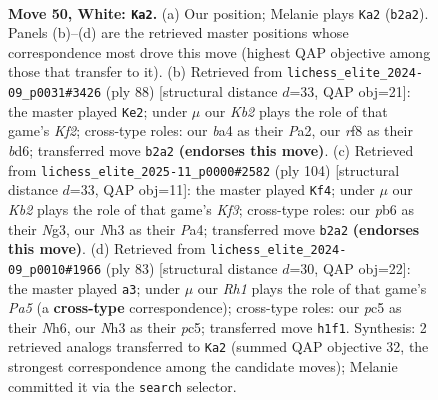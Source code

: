 \documentclass[11pt]{article}
\begin{document}
\clearpage

\begin{figure}[p]\centering
\begin{subfigure}{0.46\textwidth}\centering
\resizebox{\linewidth}{!}{%
\newchessgame
\chessboard[
  setfen={5r2/7k/1p6/p1p1r3/b7/2P2pPN/1K1N3P/7R w - - 6 50},
  showmover=false,
  pgfstyle=straightmove, color=movearrow, markmove={b2-a2}
]}
\caption{}
\end{subfigure}\hfill
\begin{subfigure}{0.46\textwidth}\centering
\resizebox{\linewidth}{!}{%
\newchessgame
\chessboard[
  setfen={3r4/7P/p1kb1pN1/Pp2p3/2p5/4P3/P4K2/7R w - - 3 45},
  showmover=false,
  pgfstyle=straightmove, color=movearrow, markmove={f2-e2}
]}
\caption{}
\end{subfigure}
\\[4pt]
\begin{subfigure}{0.46\textwidth}\centering
\resizebox{\linewidth}{!}{%
\newchessgame
\chessboard[
  setfen={6b1/2k1r3/1p5p/2p2P1P/Pp6/1P3KN1/8/1R6 w - - 3 53},
  showmover=false,
  pgfstyle=straightmove, color=movearrow, markmove={f3-f4}
]}
\caption{}
\end{subfigure}\hfill
\begin{subfigure}{0.46\textwidth}\centering
\resizebox{\linewidth}{!}{%
\newchessgame
\chessboard[
  setfen={8/2B2k1p/5p1n/2P3p1/pP2R3/7P/1r4P1/6K1 b - - 0 42},
  showmover=false,
  pgfstyle=straightmove, color=movearrow, markmove={a4-a3}
]}
\caption{}
\end{subfigure}
\caption{\textbf{Move 50, White: \texttt{Ka2}.} (a) Our position; Melanie plays \texttt{Ka2} (\texttt{b2a2}). Panels (b)--(d) are the retrieved master positions whose correspondence most drove this move (highest QAP objective among those that transfer to it). (b) Retrieved from \texttt{lichess\_elite\_2024-09\_p0031\#3426} (ply 88) [structural distance $d$=33, QAP obj=21]: the master played \texttt{Ke2}; under $\mu$ our \emph{Kb2} plays the role of that game's \emph{Kf2}; cross-type roles: our \emph{b}a4 as their \emph{P}a2, our \emph{r}f8 as their \emph{b}d6; transferred move \texttt{b2a2} \textbf{(endorses this move)}. (c) Retrieved from \texttt{lichess\_elite\_2025-11\_p0000\#2582} (ply 104) [structural distance $d$=33, QAP obj=11]: the master played \texttt{Kf4}; under $\mu$ our \emph{Kb2} plays the role of that game's \emph{Kf3}; cross-type roles: our \emph{p}b6 as their \emph{N}g3, our \emph{N}h3 as their \emph{P}a4; transferred move \texttt{b2a2} \textbf{(endorses this move)}. (d) Retrieved from \texttt{lichess\_elite\_2024-09\_p0010\#1966} (ply 83) [structural distance $d$=30, QAP obj=22]: the master played \texttt{a3}; under $\mu$ our \emph{Rh1} plays the role of that game's \emph{Pa5} (a \textbf{cross-type} correspondence); cross-type roles: our \emph{p}c5 as their \emph{N}h6, our \emph{N}h3 as their \emph{p}c5; transferred move \texttt{h1f1}. Synthesis: 2 retrieved analogs transferred to \texttt{Ka2} (summed QAP objective 32, the strongest correspondence among the candidate moves); Melanie committed it via the \texttt{search} selector.}
\label{fig:thought-m98}
\end{figure}
\end{document}
